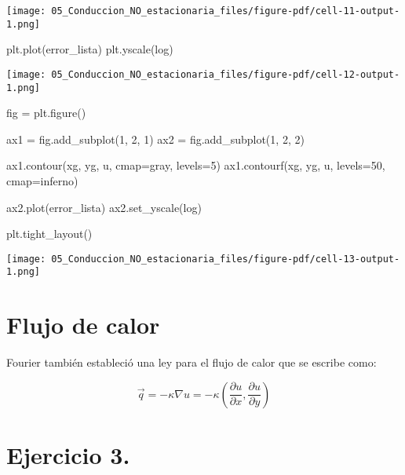 \documentclass[
  letterpaper,
  DIV=11,
  numbers=noendperiod]{scrreprt}
\newenvironment{Shaded}{\begin{snugshade}}{\end{snugshade}}
\newcommand{\DecValTok}[1]{\textcolor[rgb]{0.68,0.00,0.00}{#1}}
\newcommand{\NormalTok}[1]{\textcolor[rgb]{0.00,0.23,0.31}{#1}}
\newcommand{\OperatorTok}[1]{\textcolor[rgb]{0.37,0.37,0.37}{#1}}
\newcommand{\StringTok}[1]{\textcolor[rgb]{0.13,0.47,0.30}{#1}}
\begin{document}
\texttt{[image: 05\_Conduccion\_NO\_estacionaria\_files/figure-pdf/cell-11-output-1.png]}

\begin{Shaded}
\begin{Highlighting}[]
\NormalTok{plt.plot(error\_lista)}
\NormalTok{plt.yscale(}\StringTok{\textquotesingle{}log\textquotesingle{}}\NormalTok{)}
\end{Highlighting}
\end{Shaded}

\texttt{[image: 05\_Conduccion\_NO\_estacionaria\_files/figure-pdf/cell-12-output-1.png]}

\begin{Shaded}
\begin{Highlighting}[]
\NormalTok{fig }\OperatorTok{=}\NormalTok{ plt.figure()}

\NormalTok{ax1 }\OperatorTok{=}\NormalTok{ fig.add\_subplot(}\DecValTok{1}\NormalTok{, }\DecValTok{2}\NormalTok{, }\DecValTok{1}\NormalTok{)}
\NormalTok{ax2 }\OperatorTok{=}\NormalTok{ fig.add\_subplot(}\DecValTok{1}\NormalTok{, }\DecValTok{2}\NormalTok{, }\DecValTok{2}\NormalTok{)}

\NormalTok{ax1.contour(xg, yg, u, cmap}\OperatorTok{=}\StringTok{\textquotesingle{}gray\textquotesingle{}}\NormalTok{, levels}\OperatorTok{=}\DecValTok{5}\NormalTok{)}
\NormalTok{ax1.contourf(xg, yg, u, levels}\OperatorTok{=}\DecValTok{50}\NormalTok{, cmap}\OperatorTok{=}\StringTok{\textquotesingle{}inferno\textquotesingle{}}\NormalTok{)}

\NormalTok{ax2.plot(error\_lista)}
\NormalTok{ax2.set\_yscale(}\StringTok{\textquotesingle{}log\textquotesingle{}}\NormalTok{)}

\NormalTok{plt.tight\_layout()}
\end{Highlighting}
\end{Shaded}

\texttt{[image: 05\_Conduccion\_NO\_estacionaria\_files/figure-pdf/cell-13-output-1.png]}

\section{Flujo de calor}\label{flujo-de-calor-1}

Fourier también estableció una ley para el flujo de calor que se escribe
como:

\[
\vec{q} = -\kappa \nabla u = -\kappa \left(\dfrac{\partial u}{\partial x}, \dfrac{\partial u}{\partial y}\right)
\]

\section{Ejercicio 3.}\label{ejercicio-3.-2}
\end{document}
